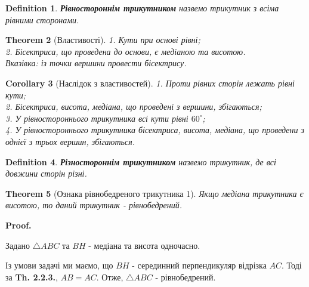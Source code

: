 \documentclass[a4paper, 10pt]{article}
\makeatletter
\def\qed{$\blacksquare$}
\theoremstyle{theoremdd}
\newtheorem{theorem}{Theorem}[subsection]
\theoremstyle{theoremdd}
\theoremstyle{theoremdd}
\newtheorem{definition}[theorem]{Definition}
\theoremstyle{theoremdd}
\theoremstyle{theoremdd}
\theoremstyle{theoremdd}
\theoremstyle{theoremdd}
\theoremstyle{theoremdd}
\theoremstyle{theoremdd}
\newtheorem{corollary}[theorem]{Corollary}
\renewenvironment{proof}[1][Proof.\\]{\par
\pushQED{\hfill \qed}%
\normalfont \topsep6\p@\@plus6\p@\relax
\trivlist
\item\relax
{\bfseries
#1\@addpunct{.}}\hspace\labelsep\ignorespaces
}{%
\popQED\endtrivlist\@endpefalse
}
\makeatother
\begin{document}
\begin{definition}
\textbf{Рівностороннім трикутником} назвемо трикутник з всіма рівними сторонами.
\end{definition}

\begin{theorem}[Властивості]
1. Кути при основі рівні;\\
2. Бісектриса, що проведена до основи, є медіаною та висотою.\\
\textit{Вказівка: із точки вершини провести бісектрису.}
\end{theorem}

\begin{corollary}[Наслідок з властивостей]
1. Проти рівних сторін лежать рівні кути;\\
2. Бісектриса, висота, медіана, що проведені з вершини, збігаються;\\
3. У рівностороннього трикутника всі кути рівні $60^\circ$;\\
4. У рівностороннього трикутника бісектриса, висота, медіана, що проведени з однієї з трьох вершин, збігаються.
\end{corollary}

\begin{definition}
\textbf{Різностороннім трикутником} назвемо трикутник, де всі довжини сторін різні.
\end{definition}

\begin{theorem}[Ознака рівнобедреного трикутника 1]
Якщо медіана трикутника є висотою, то даний трикутник - рівнобедрений.
\end{theorem}

\begin{proof}
Задано $\triangle ABC$ та $BH$ - медіана та висота одночасно.
\begin{figure}[H]
\centering
{}
\end{figure}
Із умови задачі ми маємо, що $BH$ - серединний перпендикуляр відрізка $AC$. Тоді за \textbf{Th. 2.2.3.}, $AB = AC$. Отже, $\triangle ABC$ - рівнобедрений.
\end{proof}
\end{document}
